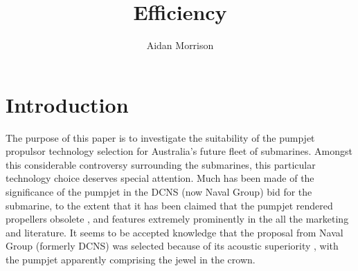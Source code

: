 \documentclass{article}\usepackage[]{graphicx}\usepackage[]{color}
\title{Efficiency}
\author{Aidan Morrison}
\begin{document}

\restoregeometry %
\nopagecolor%


\newpage




\newpage

\tableofcontents

\newpage
\setlength{\parskip}{1em}

\section{Introduction} \label{intro}

The purpose of this paper is to investigate the suitability of the pumpjet propulsor technology selection for Australia's future fleet of submarines.  Amongst this considerable controversy surrounding the submarines, this particular technology choice deserves special attention.  Much has been made of the significance of the pumpjet in the DCNS (now Naval Group) bid for the submarine, to the extent that it has been claimed that the pumpjet rendered propellers obsolete \parencite{naval2018}, and features extremely prominently in the all the marketing and literature. It seems to be accepted knowledge that the proposal from Naval Group (formerly DCNS) was selected because of its acoustic superiority \parencite{stewart2016}, with the pumpjet apparently comprising the jewel in the crown.
\end{document}

